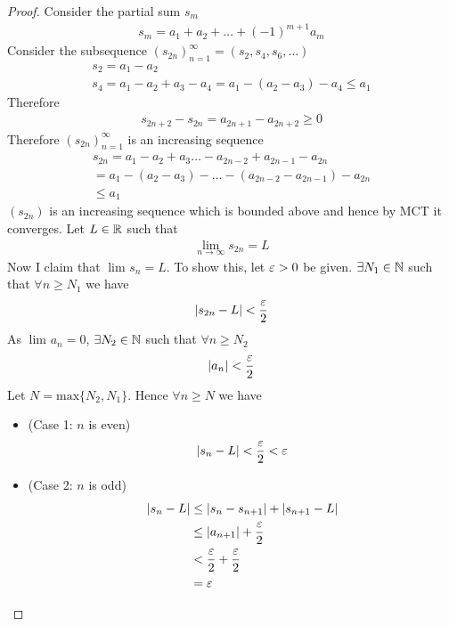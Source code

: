 \begin{proof}
	Consider the partial sum $s_m$ 
	\begin{align}
		s_m = a_1 + a_2 + \ldots + \left( -1 \right)^{m+1} a_m
	\end{align}
	Consider the subsequence $\left( s_{2n} \right)_{n=1}^{\infty} = \left( s_2, s_4, s_6, \ldots \right) $
	\begin{align}
		s_2 = a_1 - a_2 \\
		s_4 = a_1 -a_2 + a_3 - a_4 = a_1 - \left( a_2 - a_3 \right) - a_4 \le a_1
	\end{align}
	Therefore
	\begin{align}
		s_{2n+2} - s_{2n} = a_{2n+1} - a_{2n+2} \ge 0
	\end{align}
	Therefore $\left( s_{2n} \right)_{n=1}^{\infty}$ is an increasing sequence
	\begin{align}
		s_{2n} = a_1 - a_2 + a_3 \ldots - a_{2n-2} + a_{2n-1} - a_{2n} \\
		= a_1 - \left( a_2 - a_3 \right) - \ldots - \left( a_{2n-2} - a_{2n-1} \right) - a_{2n} \\
		\le a_1
	\end{align}
	$\left( s_{2n} \right) $ is an increasing sequence which is bounded above and hence by MCT it converges. Let $L \in \mathbb{R}$ such that 
	\begin{align}
		\lim_{n \to \infty} s_{2n} = L
	\end{align}
	Now I claim that $\lim_{} s_n = L$. To show this, let $\e > 0$ be given. $\exists N_1 \in \mathbb{N}$ such that $\forall  n \ge N_1$ we have 
	\begin{align}
		\left|s_{2n} - L \right| < \frac{\e}{2}
	\end{align}
	As $\lim_{} a_n = 0$, $\exists N_2 \in \mathbb{N}$ such that $\forall n \ge N_2$ 
	\begin{align}
		\left|a_n\right| < \frac{\e}{2}
	\end{align}
	Let $N = \text{max}\{N_2, N_1\} $. Hence $\forall n \ge N$ we have 
	\begin{itemize}
		\item (Case 1: $n$ is even) 
			\begin{align}
				\left|s_n - L\right| < \frac{\e}{2} < \e
			\end{align}
		\item (Case 2: $n$ is odd) 
			\begin{align}
				\left|s_n - L\right| &\le \left|s_n - s_{n+1}\right| + \left|s_{n+1} - L\right|\\
						     &\le \left|a_{n+1}\right| + \frac{\e}{2} \\
						     &< \frac{\e}{2} + \frac{\e}{2} \\
						     &= \e
			\end{align}
	\end{itemize}
\end{proof}


